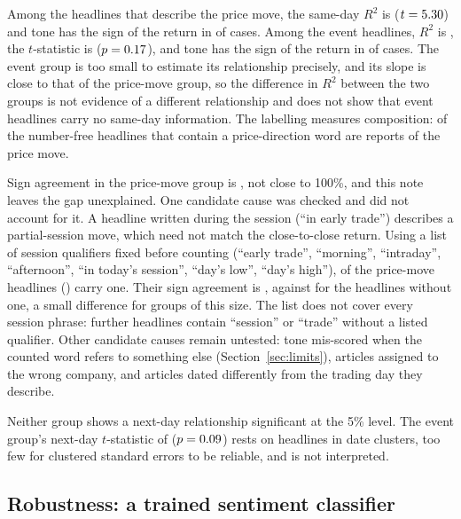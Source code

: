 \documentclass[11pt]{article}
\begin{document}
Among the headlines that describe the price move, the same-day $R^2$ is \labRsqMove{} ($t=5.30{}$) and tone has the sign of the return in \labSignMove{} of cases. Among the \labNEvent{} event headlines, $R^2$ is \labRsqEvent{}, the $t$-statistic is \labTEvent{} ($p=0.17{}$), and tone has the sign of the return in \labSignEvent{} of cases. The event group is too small to estimate its relationship precisely, and its slope is close to that of the price-move group, so the difference in $R^2$ between the two groups is not evidence of a different relationship and does not show that event headlines carry no same-day information. The labelling measures composition: \shareLabMove{} of the number-free headlines that contain a price-direction word are reports of the price move.

Sign agreement in the price-move group is \labSignMove{}, not close to 100\%, and this note leaves the gap unexplained. One candidate cause was checked and did not account for it. A headline written during the session (``in early trade'') describes a partial-session move, which need not match the close-to-close return. Using a list of session qualifiers fixed before counting (``early trade'', ``morning'', ``intraday'', ``afternoon'', ``in today's session'', ``day's low'', ``day's high''), \nSessQual{} of the \labNMove{} price-move headlines (\shareSessQual{}) carry one. Their sign agreement is \signSessQual{}, against \signSessNoQual{} for the \nSessNoQual{} headlines without one, a small difference for groups of this size. The list does not cover every session phrase: \nSessOther{} further headlines contain ``session'' or ``trade'' without a listed qualifier. Other candidate causes remain untested: tone mis-scored when the counted word refers to something else (Section~\ref{sec:limits}), articles assigned to the wrong company, and articles dated differently from the trading day they describe.

Neither group shows a next-day relationship significant at the 5\% level. The event group's next-day $t$-statistic of \labNextTEvent{} ($p=0.09{}$) rests on \labNEvent{} headlines in \labClEvent{} date clusters, too few for clustered standard errors to be reliable, and is not interpreted.

\subsection{Robustness: a trained sentiment classifier}
\label{sec:finbert}
\end{document}
